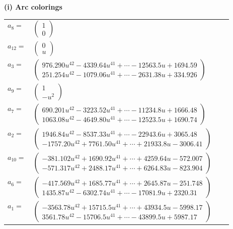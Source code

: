 \documentclass[1p]{elsarticle_modified}
\theoremstyle{definition}
\begin{document}
\flushleft \textbf{(i) Arc colorings}\\
\begin{tabular}{m{7pt} m{180pt} m{7pt} m{180pt} }
\flushright $a_{8}=$&$\begin{pmatrix}1\\0\end{pmatrix}$ \\
\flushright $a_{12}=$&$\begin{pmatrix}0\\u\end{pmatrix}$ \\
\flushright $a_{3}=$&$\begin{pmatrix}976.290 u^{42}-4339.64 u^{41}+\cdots-12563.5 u+1694.59\\251.254 u^{42}-1079.06 u^{41}+\cdots-2631.38 u+334.926\end{pmatrix}$ \\
\flushright $a_{9}=$&$\begin{pmatrix}1\\- u^2\end{pmatrix}$ \\
\flushright $a_{7}=$&$\begin{pmatrix}690.201 u^{42}-3223.52 u^{41}+\cdots-11234.8 u+1666.48\\1063.08 u^{42}-4649.80 u^{41}+\cdots-12523.5 u+1690.74\end{pmatrix}$ \\
\flushright $a_{2}=$&$\begin{pmatrix}1946.84 u^{42}-8537.33 u^{41}+\cdots-22943.6 u+3065.48\\-1757.20 u^{42}+7761.50 u^{41}+\cdots+21933.8 u-3006.41\end{pmatrix}$ \\
\flushright $a_{10}=$&$\begin{pmatrix}-381.102 u^{42}+1690.92 u^{41}+\cdots+4259.64 u-572.007\\-571.317 u^{42}+2488.17 u^{41}+\cdots+6264.83 u-823.904\end{pmatrix}$ \\
\flushright $a_{6}=$&$\begin{pmatrix}-417.569 u^{42}+1685.77 u^{41}+\cdots+2645.87 u-251.748\\1435.87 u^{42}-6302.74 u^{41}+\cdots-17081.9 u+2320.31\end{pmatrix}$ \\
\flushright $a_{1}=$&$\begin{pmatrix}-3563.78 u^{42}+15715.5 u^{41}+\cdots+43934.5 u-5998.17\\3561.78 u^{42}-15706.5 u^{41}+\cdots-43899.5 u+5987.17\end{pmatrix}$ \\

\end{tabular}
\end{document}

